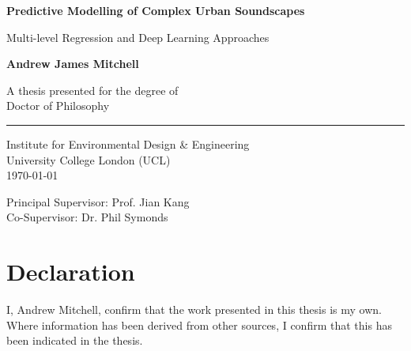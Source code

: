 \documentclass[oneside,fontsize=13pt,titlepage]{scrbook}
\begin{document}
\frontmatter
{}
\begin{titlepage}
      \AddToShipoutPicture*{}
      \begin{center}
            \vspace*{3cm}

            \Huge
            \textbf{Predictive Modelling of Complex Urban Soundscapes}

            \vspace{0.5cm}
            \LARGE
            Multi-level Regression and Deep Learning Approaches

            \vspace{1.5cm}

            \textbf{Andrew James Mitchell}

            \vfill
            A thesis presented for the degree of\\
            Doctor of Philosophy\\
            \rule[-.5cm]{0.5\textwidth}{1pt}

            \vspace{1.5cm}

            \Large
            Institute for Environmental Design \& Engineering\\
            University College London (UCL)\\
            \today

            \vspace{1cm}

            Principal Supervisor: Prof. Jian Kang\\
            Co-Supervisor: Dr. Phil Symonds

      \end{center}
\end{titlepage}


\restoregeometry


\chapter*{Declaration}
I, Andrew Mitchell, confirm that the work presented in this thesis is my own. Where information has been derived from other sources, I confirm that this has been indicated in the thesis.
\end{document}
